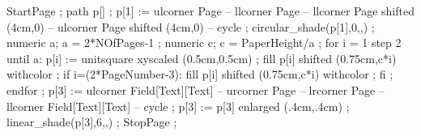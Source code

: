 

\definecolor [Item]            [r=1,g=1,b=1]
\definecolor [a]               [r=0,g=0,b=1]
\definecolor [c]               [r=.63,g=.8,b=1]
\definecolor [b]               [r=0,g=0,b=0.05]


StartPage ;
path p[] ;
p[1] := ulcorner Page -- llcorner Page -- llcorner Page shifted (4cm,0) -- ulcorner Page shifted (4cm,0) -- cycle ;
circular_shade(p[1],0,,) ;
numeric a; a = 2*NOfPages-1 ;
numeric c; c = PaperHeight/a ;
for i = 1 step 2 until a:
	p[i] := unitsquare xyscaled (0.5cm,0.5cm) ;
	fill p[i] shifted (0.75cm,c*i) withcolor  ;
	if i=(2*PageNumber-3):
		fill p[i] shifted (0.75cm,c*i) withcolor  ;
	fi ;
endfor ;
p[3] := ulcorner Field[Text][Text] -- urcorner Page -- lrcorner Page -- llcorner Field[Text][Text] -- cycle ;
p[3] := p[3] enlarged (.4cm,.4cm) ;
linear_shade(p[3],6,,) ;
StopPage ;
\stopuseMPgraphic




\lecback{\setupbackgrounds[page][background=lecbackground]}
\titback{\setupbackgrounds[page][background=lecbackground]}
\picback{\setupbackgrounds[page][background=lecbackground]}
\noback{\setupbackgrounds[page][background=lecbackground]}

\setupbackgrounds[page][background=lecbackground] 


\setupitemize[1][inmargin]

\protect
\stopmodule

\endinput

